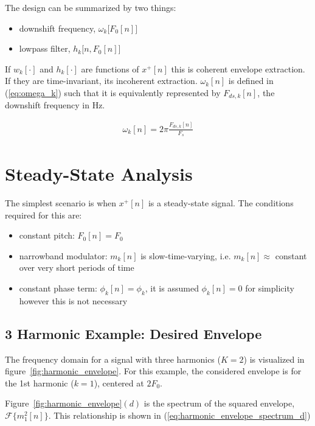 \documentclass [11pt, proquest,oneside] {ganter_thesis}[2015/03/03]
\begin{document}
The design can be summarized by two things:

\begin{itemize}
\item downshift frequency, $\omega_k\big[F_0[n]\big]$
\item lowpass filter, $h_k\big[n,F_0[n]\big]$
\end{itemize}

If $w_k[\cdot]$ and $h_k[\cdot]$ are functions of $x^+[n]$ this is coherent envelope extraction.  If they are time-invariant, its incoherent extraction.  $\omega_k[n]$ is defined in (\ref{eq:omega_k}) such that it is equivalently represented by $F_{ds,k}[n]$, the downshift frequency in Hz.

\begin{align}
\label{eq:omega_k}
\omega_k[n] = 2\pi \frac{F_{ds,k}[n]}{F_s}
\end{align}

\section{Steady-State Analysis}

The simplest scenario is when $x^+[n]$ is a steady-state signal.  The conditions required for this are:

\begin{itemize}
\item constant pitch: $F_0[n] = F_0$
\item narrowband modulator: $m_k[n]$ is slow-time-varying, i.e. $m_k[n] \approx$ constant over very short periods of time
\item constant phase term: $\phi_k[n] = \phi_k$, it is assumed $\phi_k[n] = 0$ for simplicity however this is not necessary
\end{itemize}

\subsection{3 Harmonic Example: Desired Envelope}

The frequency domain for a signal with three harmonics ($K = 2$) is visualized in figure~\ref{fig:harmonic_envelope}.  For this example, the considered envelope is for the 1st harmonic ($k = 1$), centered at $2F_0$.

Figure~\ref{fig:harmonic_envelope}$(d)$ is the spectrum of the squared envelope, $\mathcal{F}\Big\{ m^2_1[n] \Big\}$.  This relationship is shown in (\ref{eq:harmonic_envelope_spectrum_d})
\end{document}
